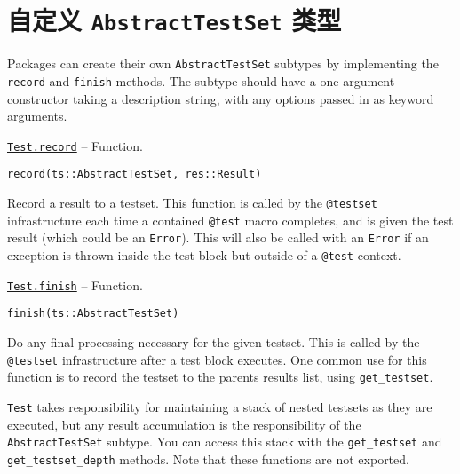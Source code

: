 \hypertarget{641042127845318623}{}


\section{自定义 \texttt{AbstractTestSet} 类型}



Packages can create their own \texttt{AbstractTestSet} subtypes by implementing the \texttt{record} and \texttt{finish} methods. The subtype should have a one-argument constructor taking a description string, with any options passed in as keyword arguments.


\hypertarget{5358474705981864018}{} 
\hyperlink{5358474705981864018}{\texttt{Test.record}}  -- {Function.}

\begin{adjustwidth}{2em}{0pt}


\begin{verbatim}
record(ts::AbstractTestSet, res::Result)
\end{verbatim}

Record a result to a testset. This function is called by the \texttt{@testset} infrastructure each time a contained \texttt{@test} macro completes, and is given the test result (which could be an \texttt{Error}). This will also be called with an \texttt{Error} if an exception is thrown inside the test block but outside of a \texttt{@test} context.



\end{adjustwidth}
\hypertarget{3045207246411142824}{} 
\hyperlink{3045207246411142824}{\texttt{Test.finish}}  -- {Function.}

\begin{adjustwidth}{2em}{0pt}


\begin{verbatim}
finish(ts::AbstractTestSet)
\end{verbatim}

Do any final processing necessary for the given testset. This is called by the \texttt{@testset} infrastructure after a test block executes. One common use for this function is to record the testset to the parent{\textquotesingle}s results list, using \texttt{get\_testset}.



\end{adjustwidth}

\texttt{Test} takes responsibility for maintaining a stack of nested testsets as they are executed, but any result accumulation is the responsibility of the \texttt{AbstractTestSet} subtype. You can access this stack with the \texttt{get\_testset} and \texttt{get\_testset\_depth} methods. Note that these functions are not exported.


